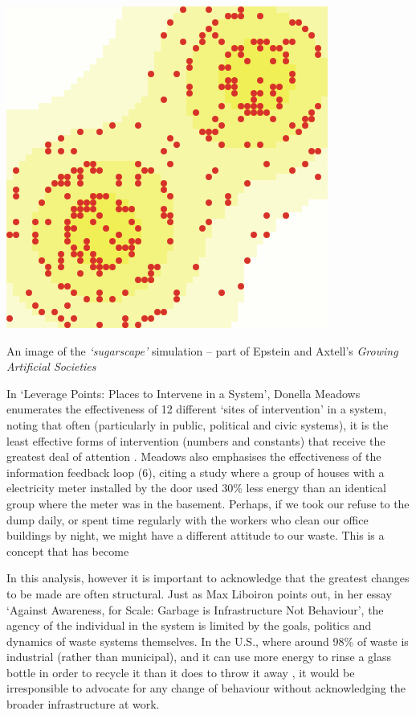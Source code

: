 \documentclass[nofonts,nols,justified,nobib]{tufte-book}
\begin{document}
\begin{marginfigure}
\includegraphics[width=\textwidth]{img/1/sugarscape.png}
\caption{An image of the \emph{`sugarscape'} simulation -- part of Epstein and Axtell's \emph{Growing Artificial Societies} \cite{epstein_growing_1996-1} \label{b}}
\end{marginfigure}

In `Leverage Points: Places to Intervene in a System', Donella Meadows enumerates the effectiveness of 12 different `sites of intervention' in a system, noting that often (particularly in public, political and civic systems), it is the least effective forms of intervention (numbers and constants) that receive the greatest deal of attention \cite{meadows_leverage_1997}. Meadows also emphasises the effectiveness of the information feedback loop (6), citing a study where a group of houses with a electricity meter installed by the door used 30\% less energy than an identical group where the meter was in the basement. Perhaps, if we took our refuse to the dump daily, or spent time regularly with the workers who clean our office buildings by night, we might have a different attitude to our waste. This is a concept that has become 

In this analysis, however it is important to acknowledge that the greatest changes to be made are often structural. Just as Max Liboiron points out, in her essay `Against Awareness, for Scale: Garbage is Infrastructure Not Behaviour', the agency of the individual in the system is limited by the goals, politics and dynamics of waste systems themselves. In the U.S., where around 98\% of waste is industrial (rather than municipal)\cite{liboiron_against_2014}, and it can use more energy to rinse a glass bottle in order to recycle it than it does to throw it away \cite{tierney_reign_2018}, it would be irresponsible to advocate for any change of behaviour without acknowledging the broader infrastructure at work.
\end{document}
